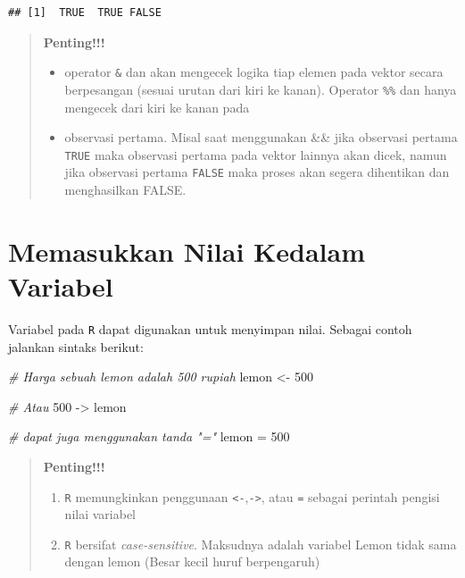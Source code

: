 \documentclass[
]{book}
\newenvironment{Shaded}{\begin{snugshade}}{\end{snugshade}}
\newcommand{\CommentTok}[1]{\textcolor[rgb]{0.56,0.35,0.01}{\textit{#1}}}
\newcommand{\DecValTok}[1]{\textcolor[rgb]{0.00,0.00,0.81}{#1}}
\newcommand{\NormalTok}[1]{#1}
\newcommand{\OtherTok}[1]{\textcolor[rgb]{0.56,0.35,0.01}{#1}}
\providecommand{\tightlist}{%
  \setlength{\itemsep}{0pt}\setlength{\parskip}{0pt}}
\theoremstyle{definition}
\theoremstyle{definition}
\theoremstyle{definition}
\theoremstyle{definition}
\theoremstyle{remark}
\begin{document}
\begin{verbatim}
## [1]  TRUE  TRUE FALSE
\end{verbatim}

\begin{quote}
\textbf{Penting!!!}

\begin{itemize}
\tightlist
\item
  operator \texttt{\&} dan \texttt{\textbar{}} akan mengecek logika tiap elemen pada vektor secara berpesangan (sesuai urutan dari kiri ke kanan).
  Operator \texttt{\%\%} dan \texttt{\textbar{}\textbar{}} hanya mengecek dari kiri ke kanan pada
\item
  observasi pertama. Misal saat menggunakan \&\& jika observasi pertama \texttt{TRUE} maka observasi pertama pada vektor lainnya akan dicek, namun jika observasi pertama \texttt{FALSE} maka proses akan segera dihentikan dan menghasilkan FALSE.
\end{itemize}
\end{quote}

\hypertarget{assigningvar}{%
\section{Memasukkan Nilai Kedalam Variabel}\label{assigningvar}}

Variabel pada \texttt{R} dapat digunakan untuk menyimpan nilai. Sebagai contoh jalankan sintaks berikut:

\begin{Shaded}
\begin{Highlighting}[]
\CommentTok{\# Harga sebuah lemon adalah 500 rupiah}
\NormalTok{lemon }\OtherTok{\textless{}{-}} \DecValTok{500}

\CommentTok{\# Atau}
\DecValTok{500} \OtherTok{{-}\textgreater{}}\NormalTok{ lemon}

\CommentTok{\# dapat juga menggunakan tanda "="}
\NormalTok{lemon }\OtherTok{=} \DecValTok{500}
\end{Highlighting}
\end{Shaded}

\begin{quote}
\textbf{Penting!!!}

\begin{enumerate}
\def\labelenumi{\arabic{enumi}.}
\tightlist
\item
  \texttt{R} memungkinkan penggunaan \texttt{\textless{}-},\texttt{-\textgreater{}}, atau \texttt{=} sebagai perintah pengisi nilai variabel
\item
  \texttt{R} bersifat \emph{case-sensitive}. Maksudnya adalah variabel Lemon tidak sama dengan lemon (Besar kecil huruf berpengaruh)
\end{enumerate}
\end{quote}
\end{document}
